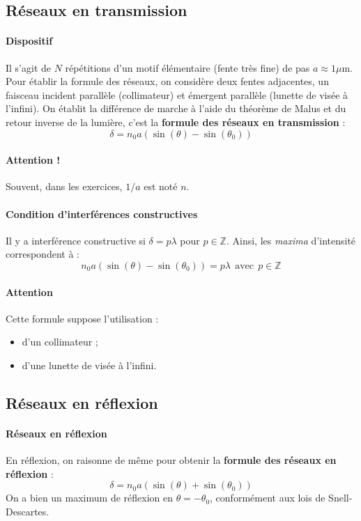\documentclass[french]{book}
\theoremstyle{plain}
\theoremstyle{definition}
\theoremstyle{remark}
\newcommand{\Z}{\mathbb{Z}}
\begin{document}
\subsection{Réseaux en transmission}
\paragraph{Dispositif} Il s'agit de $N$ répétitions d’un motif élémentaire (fente très fine) de pas $a\approx 1\mu$m. Pour établir la formule des réseaux, on considère deux fentes adjacentes, un faisceau incident parallèle (collimateur) et émergent parallèle (lunette de visée à l’infini). On établit la différence de marche à l’aide du théorème de Malus et du retour inverse de la lumière, c'est la \textbf{formule des réseaux en transmission} : $$\delta=n_0a\left(\sin(\theta)-\sin(\theta_0)\right)$$
\paragraph{Attention !} Souvent, dans les exercices, $1/a$ est noté $n$.
\paragraph{Condition d'interférences constructives} Il y a interférence constructive si $\delta=p\lambda$ pour $p\in\Z$. Ainsi, les \textit{maxima} d'intensité correspondent à : $$n_0a(\sin(\theta)-\sin(\theta_0))=p\lambda \ \ \text{avec}\ \ p\in\Z$$
\paragraph{Attention} Cette formule suppose l'utilisation :
\begin{itemize}
	\item d'un collimateur ;
	\item d'une lunette de visée à l'infini.
\end{itemize}
\subsection{Réseaux en réflexion}
\paragraph{Réseaux en réflexion} En réflexion, on raisonne de même pour obtenir la \textbf{formule des réseaux en réflexion} : $$\delta=n_0a\left(\sin(\theta)+\sin(\theta_0)\right)$$ On a bien un maximum de réflexion en $\theta=-\theta_0$, conformément aux lois de Snell-Descartes.
\end{document}
